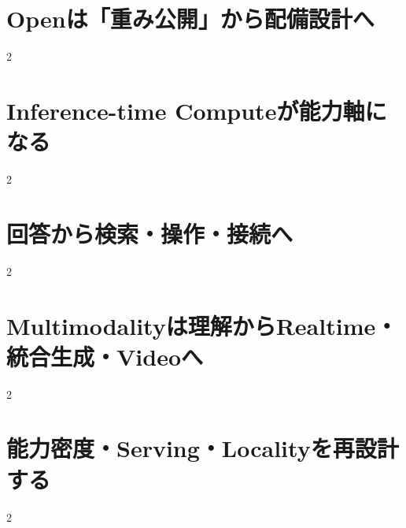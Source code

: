 \documentclass[lualatex,a4paper,11pt]{jlreq}
\begin{document}
\surveycover
\clearpage


\clearpage
\section{Openは「重み公開」から配備設計へ}
\label{pkg:open-deployment}

\medskip
\begin{multicols}{2}

\end{multicols}


\clearpage
\section{Inference-time Computeが能力軸になる}
\label{pkg:reasoning}

\medskip
\begin{multicols}{2}

\end{multicols}


\clearpage
\section{回答から検索・操作・接続へ}
\label{pkg:action-connectivity}

\medskip
\begin{multicols}{2}

\end{multicols}


\clearpage
\section{Multimodalityは理解からRealtime・統合生成・Videoへ}
\label{pkg:multimodal-media}

\medskip
\begin{multicols}{2}

\end{multicols}


\clearpage
\section{能力密度・Serving・Localityを再設計する}
\label{pkg:efficiency-serving}

\medskip
\begin{multicols}{2}

\end{multicols}

\end{document}
